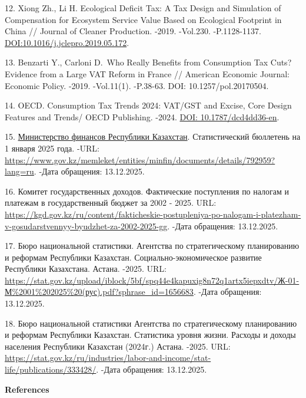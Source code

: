\begin{refs}
12. Xiong Zh., Li H. Ecological Deficit Tax: A Tax Design and Simulation
of Compensation for Ecosystem Service Value Based on Ecological
Footprint in China // Journal of Cleaner Production. -2019. -Vol.230.
-P.1128-1137.
\href{https://doi.org/10.1016/j.jclepro.2019.05.172}{DOI:10.1016/j.jclepro.2019.05.172}.

13. Benzarti Y., Carloni D.~Who Really Benefits from Consumption Tax Cuts?
Evidence from a Large VAT Reform in France // American Economic
Journal: Economic Policy. -2019. -Vol.11(1). -P.38-63. DOI:
10.1257/pol.20170504.

14. OECD. Consumption Tax Trends 2024: VAT/GST and Excise, Core Design
Features and Trends/ OECD Publishing. -2024.
\href{https://doi.org/10.1787/dcd4dd36-en}{DOI: 10.1787/dcd4dd36-en}.

15. \href{https://www.gov.kz/memleket/entities/minfin}{Министерство
финансов Республики Казахстан}. Статистический бюллетень на 1 января
2025 года. -URL:
\href{https://www.gov.kz/memleket/entities/minfin/documents/details/792959?lang=ru\%20}{https://www.gov.kz/memleket/entities/minfin/documents/details/792959?lang=ru}.
-Дата обращения: 13.12.2025.

16. Комитет государственных доходов. Фактические поступления по налогам и
платежам в государственный бюджет за 2002 - 2025. URL:
\url{https://kgd.gov.kz/ru/content/fakticheskie-postupleniya-po-nalogam-i-platezham-v-gosudarstvennyy-byudzhet-za-2002-2025-gg}.
-Дата обращения: 13.12.2025.

17. Бюро национальной статистики. Агентства по стратегическому
планированию и реформам Республики Казахстан. Социально-экономическое
развитие Республики Казахстана. Астана. -2025. URL:
\url{https://stat.gov.kz/upload/iblock/5bf/spq44e4kapuxig8n72q1artx5iepxdtv/Ж-01-М\%2001\%202025\%20(рус).pdf?sphrase_id=1656683}.
-Дата обращения: 13.12.2025.

18. Бюро национальной статистики Агентства по стратегическому планированию
и реформам Республики Казахстан. Статистика уровня жизни. Расходы и
доходы населения Республики Казахстан (2024г.) Астана. -2025. URL:
\url{https://stat.gov.kz/ru/industries/labor-and-income/stat-life/publications/333428/}.
-Дата обращения: 13.12.2025.
\end{refs}

\begin{center}
{\bfseries References}
\end{center}

